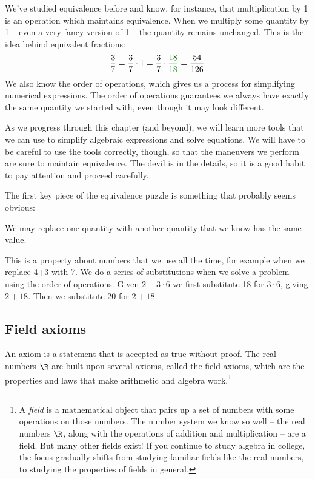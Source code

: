We've studied equivalence before and know, for instance, that multiplication by 1 is an operation which maintains equivalence. When we multiply some quantity by 1 -- even a very fancy version of 1 -- the quantity remains unchanged. This is the idea behind equivalent fractions: \[\frac{3}{7} = \frac{3}{7}\cdot{\color{green!40!black}1} = \frac{3}{7}\cdot{\color{green!40!black}\frac{18}{18}} = \frac{54}{126}\]
We also know the order of operations, which gives us a process for simplifying numerical expressions. The order of operations guarantees we always have exactly the same quantity we started with, even though it may look different.

As we progress through this chapter (and beyond), we will learn more tools that we can use to simplify algebraic expressions and solve equations. We will have to be careful to use the tools correctly, though, so that the maneuvers we perform are sure to maintain equivalence. The devil is in the details, so it is a good habit to pay attention and proceed carefully.

The first key piece of the equivalence puzzle is something that probably seems obvious:

\begin{boxeddef}[Substitution]
We may replace one quantity with another quantity that we know has the same value.
\end{boxeddef}

This is a property about numbers that we use all the time, for example when we replace 4+3 with 7. We do a series of substitutions when we solve a problem using the order of operations. Given $2+3\cdot6$ we first substitute 18 for $3\cdot6$, giving $2+18$. Then we substitute 20 for $2+18$.

\subsection{Field axioms}

An \gls{axiom} is a statement that is accepted as true without proof. The real numbers $\R$ are built upon several axioms, called the \glspl{field axiom}, which are the properties and laws that make arithmetic and algebra work.\footnote{A \textit{field} is a mathematical object that pairs up a set of numbers with some operations on those numbers. The number system we know so well -- the real numbers $\R$, along with the operations of addition and multiplication -- are a field. But many other fields exist! If you continue to study algebra in college, the focus gradually shifts from studying familiar fields like the real numbers, to studying the properties of fields in general.}

